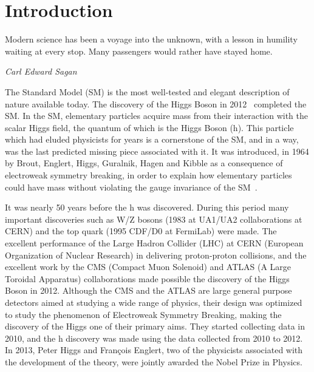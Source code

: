 %
%

\chapter{Introduction}
\epigraph{Modern science has been a voyage into the unknown, with a lesson in humility waiting at every stop. Many passengers would rather have stayed home.}{\textit{Carl Edward Sagan}}
The Standard Model (SM) is the most well-tested and elegant description of nature available today. The discovery of the Higgs Boson in 2012~\cite{Aad:2012tfa, Chatrchyan:2012ufa, Chatrchyan:2013lba} completed the SM. In the SM, elementary particles acquire mass from their interaction with the scalar Higgs field, the quantum of which is the Higgs Boson (h). This particle which had eluded physicists for years is a cornerstone of the SM, and in a way, was the last predicted missing piece associated with it. It was introduced, in 1964 by Brout, Englert, Higgs, Guralnik, Hagen and Kibble as a consequence of electroweak symmetry breaking, in order to explain how elementary particles could have mass without violating the gauge invariance of the SM~\cite{Englert:1964et,Higgs:1964ia,Higgs:1964pj,Guralnik:1964eu}.

It was nearly 50 years before the h was discovered. During this period many important discoveries such as W/Z bosons (1983 at UA1/UA2 collaborations at CERN) and the top quark (1995 CDF/D0 at FermiLab) were made. The excellent performance of the Large Hadron Collider (LHC) at CERN (European Organization of Nuclear Research) in delivering proton-proton collisions, and the excellent work by the CMS (Compact Muon Solenoid) and ATLAS (A Large Toroidal Apparatus) collaborations made possible the discovery of the Higgs Boson in 2012. Although the CMS and the ATLAS are large general purpose detectors aimed at studying a wide range of physics, their design was optimized to study the phenomenon of Electroweak Symmetry Breaking, making the discovery of the Higgs one of their primary aims. They started collecting data in 2010, and the h discovery was made using the data collected from 2010 to 2012. In 2013, Peter Higgs and François Englert, two of the physicists associated with the development of the theory, were jointly awarded the Nobel Prize in Physics.

